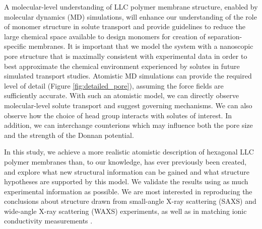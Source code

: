   A molecular-level understanding of LLC polymer membrane structure, enabled by
  molecular dynamics (MD) simulations, will enhance our understanding of the role
  of monomer structure in solute transport and provide guidelines to reduce the 
  large chemical space available to design monomers for creation of 
  separation-specific membranes. It is important that we model the system with
  a nanoscopic pore structure that is maximally consistent with experimental data
  in order to best approximate the chemical environment experienced by solutes
  in future simulated transport studies. Atomistic MD simulations can provide the required
  level of detail (Figure \ref{fig:detailed_pore}), assuming the force fields are
  sufficiently accurate. With such an atomistic model, we can directly observe
  molecular-level solute transport and suggest governing mechanisms. We can also
  observe how the choice of head group interacts with solutes of interest. In
  addition, we can interchange counterions which may influence both the pore size
  and the strength of the Donnan potential. 


  In this study, we achieve a more realistic atomistic description of
  hexagonal LLC polymer membranes than, to our knowledge, has ever previously
  been created, and explore what new structural information can be gained and
  what structure hypotheses are supported by this model. We validate the results
  using as much experimental information as possible. We are most interested in
  reproducing the conclusions about structure drawn from small-angle X-ray
  scattering (SAXS) and wide-angle X-ray scattering (WAXS) experiments, as well
  as in matching ionic conductivity measurements \cite{feng_thin_2016}.

